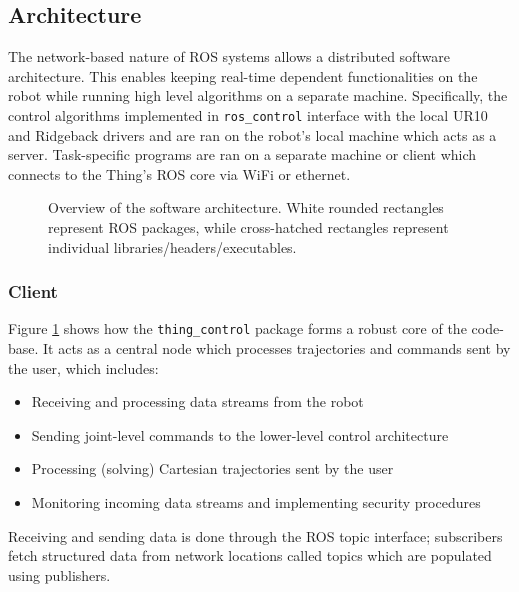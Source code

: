 \documentclass[times, utf8, diplomski, english]{fer}
\begin{document}
\subsection{Architecture}
The network-based nature of ROS systems allows a distributed software architecture.
This enables keeping real-time dependent functionalities on the robot while running high level algorithms on a separate machine.
Specifically, the control algorithms implemented in \verb|ros_control| interface with the local UR10 and Ridgeback drivers and are ran on the robot's local machine which acts as a server.
Task-specific programs are ran on a separate machine or client which connects to the Thing's ROS core via WiFi or ethernet.
\begin{figure}

\caption{Overview of the software architecture. White rounded rectangles represent ROS packages, while cross-hatched rectangles represent individual libraries/headers/executables.}
\label{fig:overview}
\end{figure} 

\subsubsection{Client}
Figure \ref{fig:overview} shows how the \verb|thing_control| package forms a robust core of the code-base.
It acts as a central node which processes trajectories and commands sent by the user, which includes:
\begin{itemize}
  \item Receiving and processing data streams from the robot
  \item Sending joint-level commands to the lower-level control architecture
  \item Processing (solving) Cartesian trajectories sent by the user
  \item Monitoring incoming data streams and implementing security procedures
\end{itemize}
Receiving and sending data is done through the ROS topic interface; subscribers fetch structured data from network locations called topics which are populated using publishers.
\end{document}
